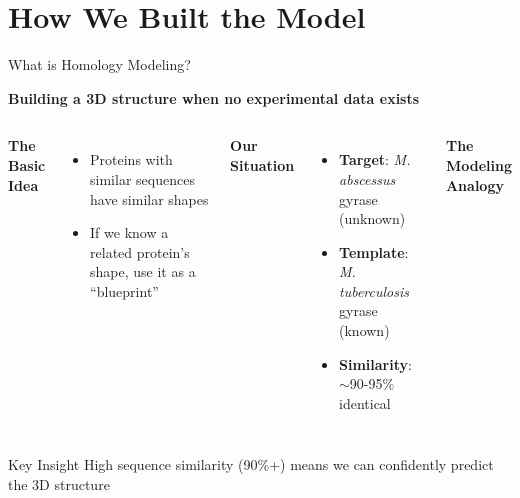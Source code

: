 \documentclass[aspectratio=169,xcolor=table]{beamer}
\begin{document}
\section{How We Built the Model}
\begin{frame}{What is Homology Modeling?}

\textbf{Building a 3D structure when no experimental data exists}

\vspace{0.3cm}

\begin{columns}
\textbf{The Basic Idea}
\begin{itemize}\setlength{\itemsep}{0pt}
    \item Proteins with similar sequences have similar shapes
    \item If we know a related protein's shape, use it as a ``blueprint''
\end{itemize}

\vspace{0.2cm}

\textbf{Our Situation}
\begin{itemize}\setlength{\itemsep}{0pt}
    \item \textbf{Target}: \textit{M. abscessus} gyrase (unknown)
    \item \textbf{Template}: \textit{M. tuberculosis} gyrase (known)
    \item \textbf{Similarity}: $\sim$90-95\% identical
\end{itemize}

\begin{center}
\textbf{The Modeling Analogy}

\end{center}
\end{columns}

\begin{block}{Key Insight}
High sequence similarity (90\%+) means we can confidently predict the 3D structure
\end{block}

\end{frame}
\end{document}
